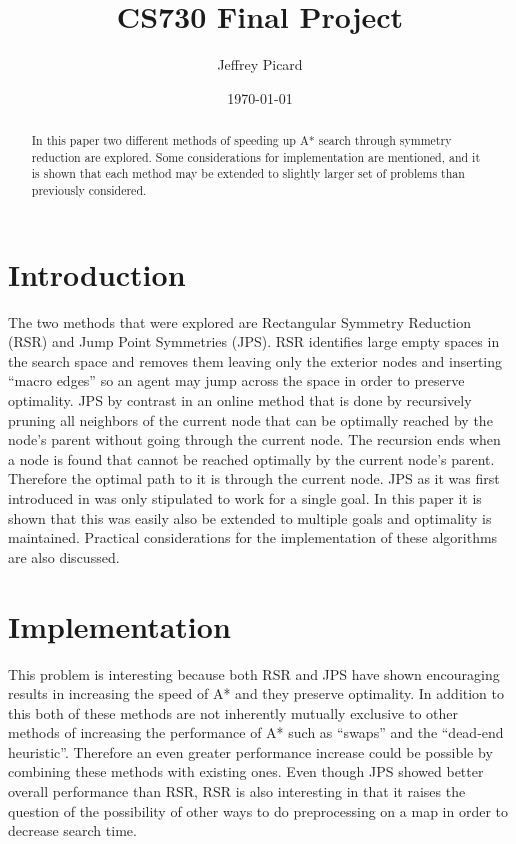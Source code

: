 \documentclass[12pt]{article}
\date{\small\today} \title{CS730 Final Project} \author{Jeffrey Picard}
\begin{document}
\maketitle


\begin{abstract}
In this paper two different methods of speeding up A* search through symmetry reduction are explored. Some considerations for implementation are mentioned,
and it is shown that each method may be extended to slightly larger set of problems than previously considered.
\end{abstract}


\section{Introduction}
The two methods that were explored are Rectangular Symmetry Reduction (RSR) and Jump Point Symmetries (JPS). RSR identifies large empty spaces
in the search space and removes them leaving only the exterior nodes and inserting ``macro edges'' so an agent may jump across the space in order to preserve
optimality. JPS by contrast in an online method that is done by recursively pruning all neighbors of the current node that can be optimally reached by the 
node's parent without going through the current node. The recursion ends when a node is found that cannot be reached optimally by the current node's parent. 
Therefore the optimal path to it is through the current node. JPS as it was first introduced in\cite{Har2011} was only stipulated to work for a single goal.
In this paper it is shown that this was easily also be extended to multiple goals and optimality is maintained. Practical considerations for the implementation
of these algorithms are also discussed.
	
\section{Implementation}
This problem is interesting because both RSR and JPS have shown encouraging results in increasing the speed of A* and they preserve optimality. In addition to
this both of these methods are not inherently mutually exclusive to other methods of increasing the performance of A* such as ``swaps''  and the ``dead-end
heuristic''\cite{Har2010,Har2011}.  Therefore an even greater performance increase could be possible by combining these methods with existing ones. 
Even though JPS showed better overall performance than RSR, RSR is also interesting in that it raises the question of the possibility of other ways to do 
preprocessing on a map in order to decrease search time. 
\end{document}
